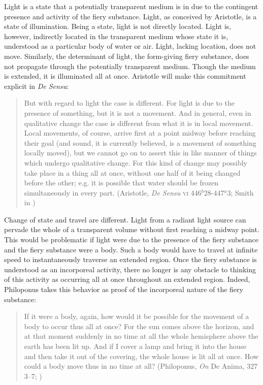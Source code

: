 Light is a state that a potentially transparent medium is in due to the contingent presence and activity of the fiery substance. Light, as conceived by Aristotle, is a state of illumination. Being a state, light is not directly located. Light is, however, indirectly located in the transparent medium whose state it is, understood as a particular body of water or air. Light, lacking location, does not move. Similarly, the determinant of light, the form-giving fiery substance, does not propagate through the potentially transparent medium. Though the medium is extended, it is illuminated all at once. Aristotle will make this commitment explicit in \emph{De Sensu}:
	\begin{quote}	
		But with regard to light the case is different. For light is due to the presence of something, but it is not a movement. And in general, even in qualitative change the case is different from what it is in local movement. Local movements, of course, arrive first at a point midway before reaching their goal (and sound, it is currently believed, is a movement of something locally moved), but we cannot go on to assert this in like manner of things which undergo qualitative change. For this kind of change may possibly take place in a thing all at once, without one half of it being changed before the other; e.g. it is possible that water should be frozen simultaneously in every part. (Aristotle, \emph{De Sensu} \textsc{vi} 446\( ^{b} \)28-447\( ^{a} \)3; Smith in \citealt[63]{Barnes:1984uq})
	\end{quote}
Change of state and travel are different. Light from a radiant light source can pervade the whole of a transparent volume without first reaching a midway point. This would be problematic if light were due to the presence of the fiery substance and the fiery substance were a body. Such a body would have to travel at infinite speed to instantaneously traverse an extended region. Once the fiery substance is understood as an incorporeal activity, there no longer is any obstacle to thinking of this activity as occurring all at once throughout an extended region. Indeed, Philoponus takes this behavior as proof of the incorporeal nature of the fiery substance:
	\begin{quote}	
		If it were a body, again, how would it be possible for the movement of a body to occur thus all at once? For the sun comes above the horizon, and at that moment suddenly in no time at all the whole hemisphere above the earth has been lit up. And if I cover a lamp and bring it into the house and then take it out of the covering, the whole house is lit all at once. How could a body move thus in no time at all? (Philoponus, \emph{On} De Anima, 327 3--7; \citealt[11]{Charlton:2005fk})
	\end{quote}
